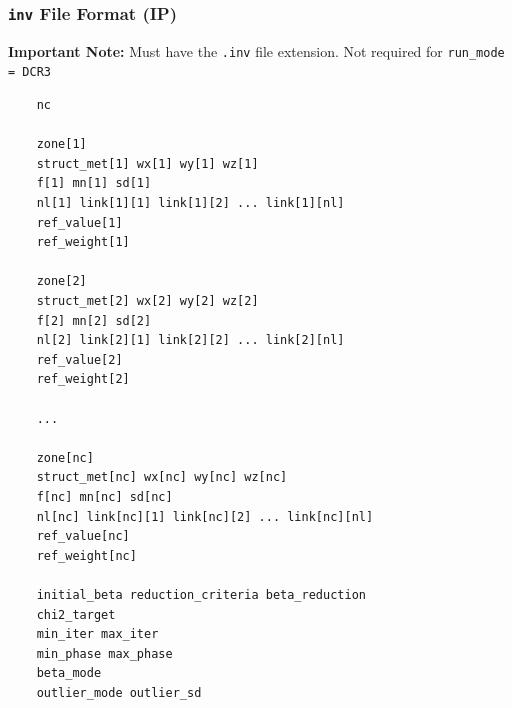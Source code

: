 \documentclass[a4paper,12pt]{article}
\begin{document}
\subsubsection{\texttt{inv} File Format (IP)} \label{inversion_ip}

\begin{framed}
\noindent \textbf{Important Note:} Must have the \texttt{.inv} file extension. Not required for \texttt{run\_mode = DCR3}
\end{framed}

\begin{framed}
\begin{verbatim}
    nc

    zone[1]
    struct_met[1] wx[1] wy[1] wz[1]
    f[1] mn[1] sd[1]
    nl[1] link[1][1] link[1][2] ... link[1][nl]
    ref_value[1]
    ref_weight[1]

    zone[2]
    struct_met[2] wx[2] wy[2] wz[2]
    f[2] mn[2] sd[2]
    nl[2] link[2][1] link[2][2] ... link[2][nl]
    ref_value[2]
    ref_weight[2]

    ...

    zone[nc]
    struct_met[nc] wx[nc] wy[nc] wz[nc]
    f[nc] mn[nc] sd[nc]
    nl[nc] link[nc][1] link[nc][2] ... link[nc][nl]
    ref_value[nc]
    ref_weight[nc]

    initial_beta reduction_criteria beta_reduction
    chi2_target
    min_iter max_iter
    min_phase max_phase
    beta_mode
    outlier_mode outlier_sd
\end{verbatim}
\end{framed}
\end{document}
